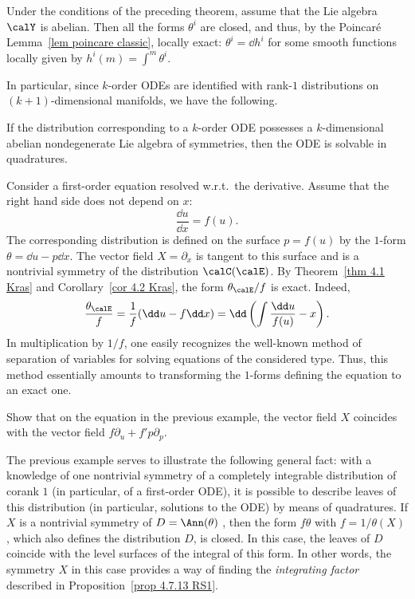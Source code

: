 \begin{cor}\label{cor 4.2 Kras}
    Under the conditions of the preceding theorem, assume that the Lie algebra $\calY$ is abelian. Then all the forms $\theta^i$ are closed, and thus, by the Poincar\'e Lemma~\ref{lem poincare classic}, locally exact: $\theta^i=\dd h^i$ for some smooth functions locally given by $h^i(m)=\int^m\theta^i$.
\end{cor}

In particular, since $k$-order ODEs are identified with rank-$1$ distributions on $(k+1)$-dimensional manifolds, we have the following.

\begin{cor}\label{cor 4.3 Kras}
    If the distribution corresponding to a $k$-order ODE possesses a $k$-dimensional abelian nondegenerate Lie algebra of symmetries, then the ODE is solvable in quadratures.
\end{cor}

\begin{example}
    Consider a first-order equation resolved w.r.t.\ the derivative. Assume that the right hand side does not depend on $x$:
    \[\frac{\dd u}{\dd x}=f(u).\]
    The corresponding distribution is defined on the surface $p=f(u)$ by the $1$-form $\theta=\dd u-p\dd x$. The vector field $X=\partial_x$ is tangent to this surface and is a nontrivial symmetry of the distribution $\calC(\calE)$. By Theorem~\ref{thm 4.1 Kras} and Corollary~\ref{cor 4.2 Kras}, the form $\theta_\calE\slash f$ is exact. Indeed, 
    \[\frac{\theta_\calE}{f}=\frac{1}{f}(\dd u-f\dd x)=\dd\left(\int \frac{\dd u}{f(u)}-x\right).\]
    In multiplication by $1\slash f$, one easily recognizes the well-known method of separation of variables for solving equations of the considered type. Thus, this method essentially amounts to transforming the $1$-forms defining the equation to an exact one.
\end{example}

\begin{xca}
    Show that on the equation in the previous example, the vector field $X$ coincides with the vector field $f\partial_u+f'p\partial_p$.
\end{xca}

The previous example serves to illustrate the following general fact: with a knowledge of one nontrivial symmetry of a completely integrable distribution of corank $1$ (in particular, of a first-order ODE), it is possible to describe leaves of this distribution (in particular, solutions to the ODE) by means of quadratures. If $X$ is a nontrivial symmetry of $D=\Ann(\theta)$ , then the form $f\theta$ with $f=1/\theta(X)$, which also defines the distribution $D$, is closed. In this case, the leaves of $D$ coincide with the level surfaces of the integral of this form. In other words, the symmetry $X$ in this case provides a way of finding the \emph{integrating factor} described in Proposition~\ref{prop 4.7.13 RS1}. 

